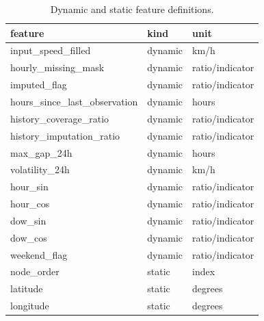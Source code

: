 \begin{table}[!htbp]
\centering
\caption{Dynamic and static feature definitions.}
\begin{tabular}{lll}
\hline
feature & kind & unit \\ 
\hline
input\_speed\_filled & dynamic & km/h \\
hourly\_missing\_mask & dynamic & ratio/indicator \\
imputed\_flag & dynamic & ratio/indicator \\
hours\_since\_last\_observation & dynamic & hours \\
history\_coverage\_ratio & dynamic & ratio/indicator \\
history\_imputation\_ratio & dynamic & ratio/indicator \\
max\_gap\_24h & dynamic & hours \\
volatility\_24h & dynamic & km/h \\
hour\_sin & dynamic & ratio/indicator \\
hour\_cos & dynamic & ratio/indicator \\
dow\_sin & dynamic & ratio/indicator \\
dow\_cos & dynamic & ratio/indicator \\
weekend\_flag & dynamic & ratio/indicator \\
node\_order & static & index \\
latitude & static & degrees \\
longitude & static & degrees \\
\hline
\end{tabular}
\end{table}
